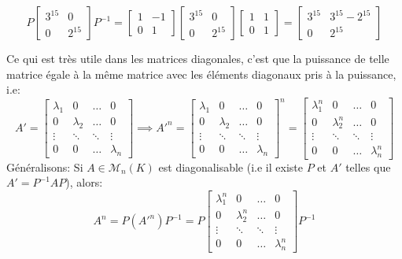 \begin{ex}
 \[
     P \begin{bmatrix} 3^{15} & 0 \\ 0 & 2^{15} \end{bmatrix} P^{-1} = \begin{bmatrix} 1 & -1 \\ 0 & 1 \end{bmatrix} \begin{bmatrix} 3^{15} & 0 \\ 0 & 2^{15} \end{bmatrix}\begin{bmatrix} 1 & 1 \\ 0 & 1 \end{bmatrix} = \begin{bmatrix} 3^{15} & 3^{15} - 2^{15} \\ 0 & 2^{15}\end{bmatrix} 
\] 
\end{ex}
Ce qui est très utile dans les matrices diagonales, c'est que la puissance de telle matrice égale à la même matrice avec les éléments diagonaux pris à la puissance, i.e:
\[
    A' = \begin{bmatrix} 
        \lambda_1 & 0 & \ldots & 0\\ 
        0 & \lambda_2 & \ldots & 0\\
        \vdots & \ddots & \ddots & \vdots\\
        0 & 0 & \ldots & \lambda_n
    \end{bmatrix} \implies A'^{n} = \begin{bmatrix} 
        \lambda_1 & 0 & \ldots & 0\\ 
        0 & \lambda_2 & \ldots & 0\\
        \vdots & \ddots & \ddots & \vdots\\
        0 & 0 & \ldots & \lambda_n
    \end{bmatrix}^{n} = \begin{bmatrix} 
        \lambda_1^n & 0 & \ldots & 0\\ 
        0 & \lambda_2^n & \ldots & 0\\
        \vdots & \ddots & \ddots & \vdots\\
        0 & 0 & \ldots & \lambda_n^n
    \end{bmatrix}
\] 
Généralisons: Si $A \in \mathcal{M}_n(K)$ est diagonalisable (i.e  il existe $P$ et  $A'$ telles que  $A' = P^{-1}AP$), alors:
\[
    A^{n} = P(A'^{n})P^{-1} = P\begin{bmatrix} 
        \lambda_1^n & 0 & \ldots & 0\\ 
        0 & \lambda_2^n & \ldots & 0\\
        \vdots & \ddots & \ddots & \vdots\\
        0 & 0 & \ldots & \lambda_n^n
    \end{bmatrix}P^{-1}
\] 

